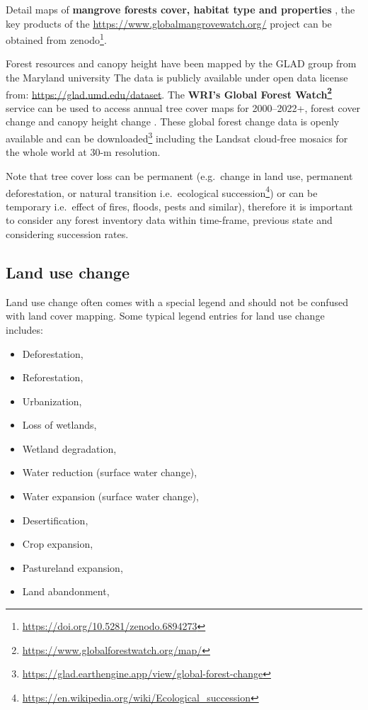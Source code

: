 \documentclass[
  graybox,natbib,nospthms]{svmono}
\providecommand{\tightlist}{%
  \setlength{\itemsep}{0pt}\setlength{\parskip}{0pt}}
\providecommand{\tightlist}{\setlength{\itemsep}{0pt}\setlength{\parskip}{0pt}}
\renewcommand{\href}[2]{#2 (\url{#1})}
\renewcommand{\href}[2]{#2\footnote{\url{#1}}}
\begin{document}
Detail maps of \textbf{mangrove forests cover, habitat type and properties} \citep{Bunting2022},
the key products of the \url{https://www.globalmangrovewatch.org/} project can be obtained from \href{https://doi.org/10.5281/zenodo.6894273}{zenodo}.

Forest resources and canopy height have been mapped by the GLAD group from the Maryland university \citep{POTAPOV2021112165}
The data is publicly available under open data license from: \url{https://glad.umd.edu/dataset}.
The \textbf{\href{https://www.globalforestwatch.org/map/}{WRI's Global Forest Watch}} service can be used to access annual tree cover maps for 2000--2022+,
forest cover change and canopy height change \citep{hansen2013high}. These global forest change data is openly available and can be \href{https://glad.earthengine.app/view/global-forest-change}{downloaded} including the Landsat cloud-free mosaics for the whole world at 30-m resolution.

Note that tree cover loss can be permanent (e.g.~change in land use, permanent deforestation, or natural transition i.e.~\href{https://en.wikipedia.org/wiki/Ecological_succession}{ecological succession}) or
can be temporary i.e.~effect of fires, floods, pests and similar), therefore it
is important to consider any forest inventory data within time-frame, previous state and
considering succession rates.

\hypertarget{land-use-change}{%
\subsection{Land use change}\label{land-use-change}}

Land use change often comes with a special legend and should not be confused with
land cover mapping. Some typical legend entries for land use change includes:

\begin{itemize}
\tightlist
\item
  Deforestation,
\item
  Reforestation,
\item
  Urbanization,
\item
  Loss of wetlands,
\item
  Wetland degradation,
\item
  Water reduction (surface water change),
\item
  Water expansion (surface water change),
\item
  Desertification,
\item
  Crop expansion,
\item
  Pastureland expansion,
\item
  Land abandonment,
\end{itemize}
\end{document}
